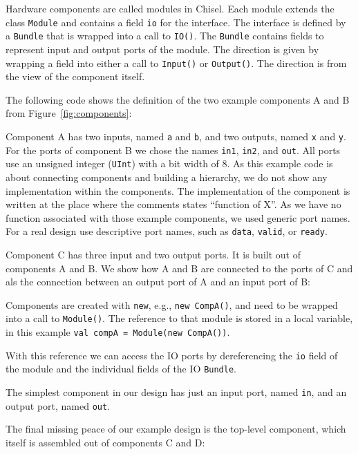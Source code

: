 \documentclass[%
    10pt,
    headinclude, footexclude,
    openright, %
    notitlepage,
    cleardoubleempty,
    headsepline,
    pointlessnumbers,
    bibtotoc, idxtotoc,
    ]{scrbook}
\newcommand{\code}[1]{{\small{\texttt{#1}}}}
\begin{document}
Hardware components are called modules in Chisel. Each module extends
the class \code{Module} and contains a field \code{io} for the interface.
The interface is defined by a \code{Bundle} that is wrapped into a call to \code{IO()}.
The \code{Bundle} contains fields to represent input and output ports of
the module. The direction is given by wrapping a field into either a call to \code{Input()}
or \code{Output()}. The direction is from the view of the component itself.

The following code shows the definition of the two example components A and B from
Figure~\ref{fig:components}:


\noindent Component A has two inputs, named \code{a} and \code{b}, and two
outputs, named \code{x} and \code{y}. For the ports of component B
we chose the names \code{in1}, \code{in2}, and \code{out}.
All ports use an unsigned integer (\code{UInt}) with a bit width of 8.
As this example code is about connecting components and building a
hierarchy, we do not show any implementation within the components.
The implementation of the component is written at the place where
the comments states ``function of X''.
As we have no function associated with those example components,
we used generic port names. For a real design use descriptive
port names, such as \code{data}, \code{valid}, or \code{ready}.

Component C has three input and two output ports. It is built out of
components A and B. We show how A and B are connected to the ports
of C and als the connection between an output port of A and an
input port of B:


Components are created with \code{new}, e.g., \code{new CompA()}, and need to be wrapped
into a call to \code{Module()}. The reference to that module is stored in a local variable,
in this example \code{val compA = Module(new CompA())}.

With this reference we can access the IO ports by dereferencing the \code{io} field of the module
and the individual fields of the IO \code{Bundle}.

The simplest component in our design has just an input port, named \code{in}, and
an output port, named \code{out}.


The final missing peace of our example design is the top-level component, which itself
is assembled out of components C and D:
\end{document}
